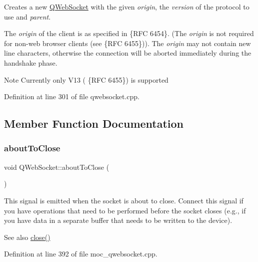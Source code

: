 Creates a new \mbox{\hyperlink{class_q_web_socket}{Q\+Web\+Socket}} with the given {\itshape origin}, the {\itshape version} of the protocol to use and {\itshape parent}. 

The {\itshape origin} of the client is as specified in  \{R\+FC 6454\}. (The {\itshape origin} is not required for non-\/web browser clients (see  \{R\+FC 6455\})). The {\itshape origin} may not contain new line characters, otherwise the connection will be aborted immediately during the handshake phase. \begin{DoxyNote}{Note}
Currently only V13 ( \{R\+FC 6455\}) is supported 
\end{DoxyNote}


Definition at line 301 of file qwebsocket.\+cpp.



\subsection{Member Function Documentation}
\mbox{\label{class_q_web_socket_a74faf7acf77a4b74cf2c5caa74b1d77a}} 
\subsubsection{\texorpdfstring{about\+To\+Close}{aboutToClose}}
{\footnotesize\ttfamily void Q\+Web\+Socket\+::about\+To\+Close (\begin{DoxyParamCaption}{ }\end{DoxyParamCaption})\hspace{0.3cm}{\ttfamily [signal]}}

This signal is emitted when the socket is about to close. Connect this signal if you have operations that need to be performed before the socket closes (e.\+g., if you have data in a separate buffer that needs to be written to the device).

\begin{DoxySeeAlso}{See also}
\mbox{\hyperlink{class_q_web_socket_ae1c9af16e7f53666ccd423864b8e2c35}{close()}} 
\end{DoxySeeAlso}


Definition at line 392 of file moc\+\_\+qwebsocket.\+cpp.

\mbox{\label{class_q_web_socket_a43bf9793d8edec549ea45d503e9be366}} 
